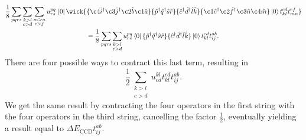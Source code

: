 \begin{equation}
    \begin{gathered}
    \frac{1}{8}\sum_{pqrs}\sum_{\substack{k>l \\ c>d}} \sum_{\substack{m>n \\ e>f}}
    u^{pq}_{rs} \bra{0}
      \wick{ 
            \{\c4{\hat{i}}^\dagger \c3{\hat{j}}^\dagger \c2{\hat{b}} \c1{\hat{a}} \}
            \{\hat{p}^\dagger \hat{q}^\dagger \hat{s} \hat{r} \}
            \{\hat{c}^\dagger \hat{d}^\dagger \hat{l} \hat{k} \}
            \{\c1{\hat{e}}^\dagger \c2{\hat{f}}^\dagger \c3{\hat{n}} \c4{\hat{m}} \}
        \ket{0} t^{cd}_{kl} t^{ef}_{mn}
        } \\
    =
    \frac{1}{8}\sum_{pqrs}\sum_{\substack{k>l \\ c>d}}
    u^{pq}_{rs} \bra{0}
        \{\hat{p}^\dagger \hat{q}^\dagger \hat{s} \hat{r} \}
        \{\hat{c}^\dagger \hat{d}^\dagger \hat{l} \hat{k} \}
    \ket{0} t^{cd}_{kl} t^{ab}_{ij}.
    \end{gathered}
\end{equation}
There are four possible ways to contract this last term, resulting in
\begin{equation}
    \frac{1}{2}\sum_{\substack {k>l \\ c >d }}
        u^{kl}_{cd} t^{cd}_{kl} t^{ab}_{ij}.
\end{equation}
We get the same result by contracting the four operators in the first 
string with the four operators in the third string, cancelling the
factor $\frac{1}{2}$, eventually yielding a result equal to
$\Delta E_{\text{CCD}} t^{ab}_{ij}$.

